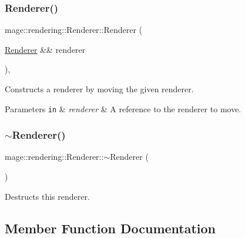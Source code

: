 \subsubsection{\texorpdfstring{Renderer()}{Renderer()}\hspace{0.1cm}{\footnotesize\ttfamily [3/3]}}
{\footnotesize\ttfamily mage\+::rendering\+::\+Renderer\+::\+Renderer (\begin{DoxyParamCaption}\item[{\hyperlink{classmage_1_1rendering_1_1_renderer}{Renderer} \&\&}]{renderer }\end{DoxyParamCaption})\hspace{0.3cm}{\ttfamily [default]}, {\ttfamily [noexcept]}}

Constructs a renderer by moving the given renderer.


\begin{DoxyParams}[1]{Parameters}
\mbox{\tt in}  & {\em renderer} & A reference to the renderer to move. \\
\hline
\end{DoxyParams}
\hypertarget{classmage_1_1rendering_1_1_renderer_ab5c0553ac8a095f55eab371b843b354b}{}\label{classmage_1_1rendering_1_1_renderer_ab5c0553ac8a095f55eab371b843b354b} 
\subsubsection{\texorpdfstring{$\sim$\+Renderer()}{~Renderer()}}
{\footnotesize\ttfamily mage\+::rendering\+::\+Renderer\+::$\sim$\+Renderer (\begin{DoxyParamCaption}{ }\end{DoxyParamCaption})\hspace{0.3cm}{\ttfamily [default]}}

Destructs this renderer. 

\subsection{Member Function Documentation}
\hypertarget{classmage_1_1rendering_1_1_renderer_a7fa8fd234b69dabc51d7a214afb641b3}{}\label{classmage_1_1rendering_1_1_renderer_a7fa8fd234b69dabc51d7a214afb641b3} 
